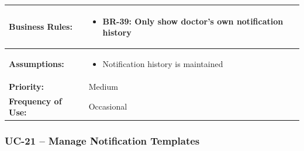 \documentclass[12pt,a4paper]{article}
\begin{document}
\begin{longtable}{|p{4.5cm}|p{10.5cm}|}
\textbf{Business Rules:} &
\begin{itemize}
  \item BR-39: Only show doctor's own notification history
\end{itemize} \\
\hline
\textbf{Assumptions:} &
\begin{itemize}
  \item Notification history is maintained
\end{itemize} \\
\hline
\textbf{Priority:} & Medium \\
\hline
\textbf{Frequency of Use:} & Occasional \\
\hline
\end{longtable}

\subsubsection{UC-21 – Manage Notification Templates}
\end{document}
